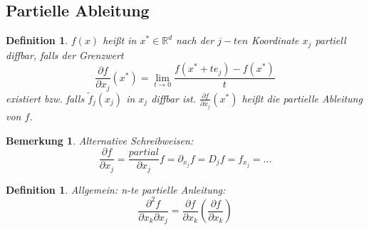 \documentclass[12pt,a4paper]{report}%
\newtheorem{definition}[satz]{Definition}
\newtheorem{bem}{Bemerkung}[section]
\numberwithin{equation}{section}
\newcommand{\R}{\mathbb{R}} %
\newcommand{\diffp}{\partial}
\numberwithin{equation}{subsection}
\begin{document}
  \subsection{Partielle Ableitung}
  \begin{definition}
    $f(x)$ heißt in $x^* \in \R^d$ nach der $j-ten$ Koordinate $x_j$ partiell diffbar, falls der Grenzwert
    \begin{equation}
      \frac{\partial f}{\partial x_j}(x^*) = \lim\limits_{t\rightarrow 0} \frac{f(x^* + t e_j) - f(x^*)}{t}
    \end{equation}
    existiert bzw. falls $\tilde{f}_j(x_j)$ in $x_j$ diffbar ist. $\frac{\partial f}{\partial x_j}(x^*)$ heißt die partielle Ableitung von $f$. 
  \end{definition}
  \begin{bem}
    Alternative Schreibweisen:
    \begin{equation}
      \frac{\partial f}{\partial x_j} = \frac{partial}{\partial x_j} f = \partial_{x_j} f = D_j f  = f_{x_j} = ...
    \end{equation}
  \end{bem}
  \begin{definition}
    Allgemein: n-te partielle Anleitung:
    \begin{equation}
      \frac{\diffp^2f}{\diffp x_k \diffp x_j} = \frac{\diffp f}{\diffp x_k}\left(\frac{\diffp f}{\diffp x_k} \right)
    \end{equation}
  \end{definition}
  
\end{document}
